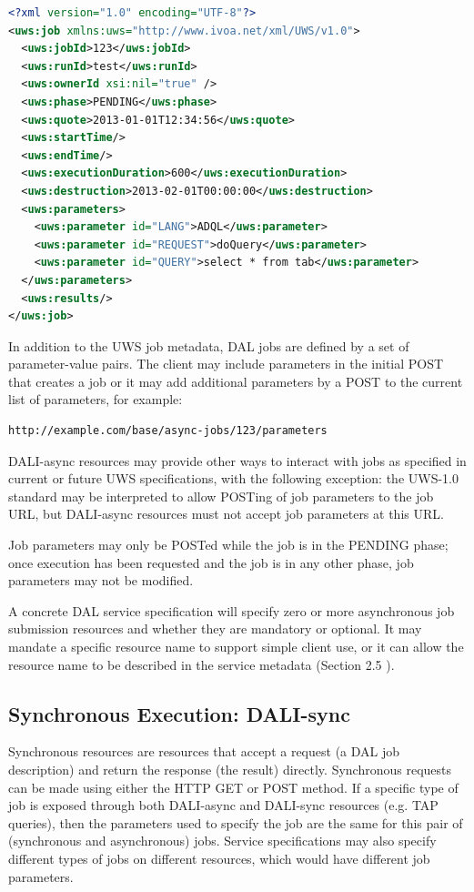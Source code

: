 \documentclass[11pt,letter]{ivoa}
\begin{document}
\begin{lstlisting}[language=XML,basicstyle=\footnotesize]
<?xml version="1.0" encoding="UTF-8"?>
<uws:job xmlns:uws="http://www.ivoa.net/xml/UWS/v1.0">
  <uws:jobId>123</uws:jobId>
  <uws:runId>test</uws:runId>
  <uws:ownerId xsi:nil="true" />
  <uws:phase>PENDING</uws:phase>
  <uws:quote>2013-01-01T12:34:56</uws:quote>
  <uws:startTime/>
  <uws:endTime/>
  <uws:executionDuration>600</uws:executionDuration>
  <uws:destruction>2013-02-01T00:00:00</uws:destruction>
  <uws:parameters>
    <uws:parameter id="LANG">ADQL</uws:parameter>
    <uws:parameter id="REQUEST">doQuery</uws:parameter>
    <uws:parameter id="QUERY">select * from tab</uws:parameter>
  </uws:parameters>
  <uws:results/>
</uws:job>
\end{lstlisting}

In addition to the UWS job metadata, DAL jobs are defined by a set of 
parameter-value pairs. The client may include parameters in the initial POST 
that creates a job or it may add additional parameters by a POST to the current 
list of parameters, for example:

\begin{verbatim}
http://example.com/base/async-jobs/123/parameters
\end{verbatim}

DALI-async resources may provide other ways to interact with jobs as specified 
in current or future UWS specifications, with the following exception: the 
UWS-1.0 standard may be interpreted to allow POSTing of job parameters to the 
job URL, but DALI-async resources must not accept job parameters at this URL.

Job parameters may only be POSTed while the job is in the PENDING phase; once 
execution has been requested and the job is in any other phase, job parameters 
may not be modified.

A concrete DAL service specification will specify zero or more asynchronous job 
submission resources and whether they are mandatory or optional. It may mandate 
a specific resource name to support simple client use, or it can allow the 
resource name to be described in the service metadata (Section 2.5 ).

\subsection{Synchronous Execution: DALI-sync}
\label{sec:dali-sync}
Synchronous resources are resources that accept a request (a DAL job 
description) and return the response (the result) directly. Synchronous requests 
can be made using either the HTTP GET or POST method. If a specific type of job 
is exposed through both DALI-async and DALI-sync resources (e.g. TAP queries), 
then the parameters used to specify the job are the same for  this pair of 
(synchronous and asynchronous) jobs. Service specifications may also specify 
different types of jobs on different resources, which would have different job 
parameters.
\end{document}

